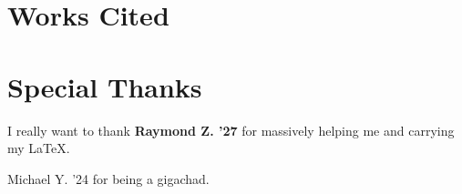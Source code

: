 \chapter{Works Cited}

\chapter{Special Thanks}
I really want to thank \textbf{Raymond Z. '27} for massively helping me
and carrying my \LaTeX.

Michael Y. '24 for being a gigachad.